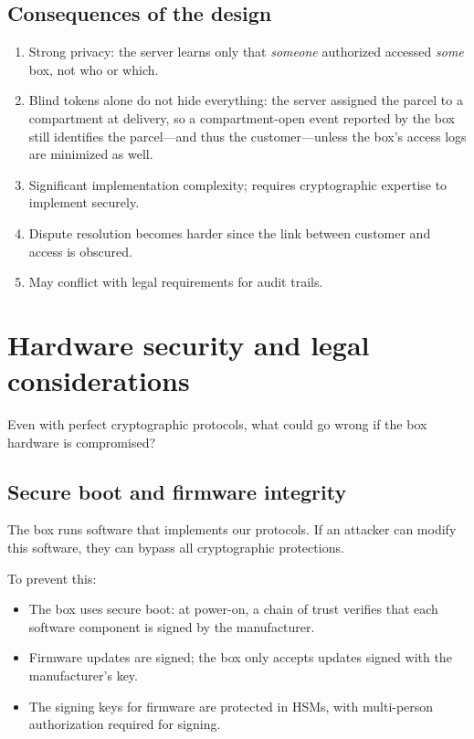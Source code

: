 \subsection{Consequences of the design}

\begin{enumerate}
  \item Strong privacy: the server learns only that \emph{someone}
    authorized accessed \emph{some} box, not who or which.
  \item Blind tokens alone do not hide everything: the server assigned the
    parcel to a compartment at delivery, so a compartment-open event
    reported by the box still identifies the parcel---and thus the
    customer---unless the box's access logs are minimized as well.
  \item Significant implementation complexity; requires cryptographic
    expertise to implement securely.
  \item Dispute resolution becomes harder since the link between customer
    and access is obscured.
  \item May conflict with legal requirements for audit trails.
\end{enumerate}


\section{Hardware security and legal considerations}\label{HardwareLegal}


\begin{exercise}
  Even with perfect cryptographic protocols, what could go wrong if the
  box hardware is compromised?
\end{exercise}

\subsection{Secure boot and firmware integrity}

The box runs software that implements our protocols.
If an attacker can modify this software, they can bypass all
cryptographic protections.

To prevent this:
\begin{itemize}
  \item The box uses secure boot: at power-on, a chain of trust verifies
    that each software component is signed by the manufacturer.
  \item Firmware updates are signed; the box only accepts updates signed
    with the manufacturer's key.
  \item The signing keys for firmware are protected in HSMs, with
    multi-person authorization required for signing.
\end{itemize}


